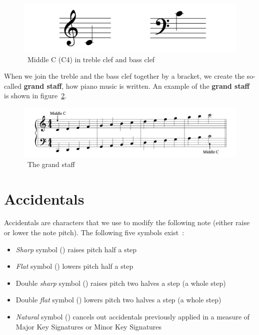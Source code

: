 \begin{figure}
    \centering
    \includegraphics[width=\textwidth]{assets/middle-c}
    \caption{~Middle C (C4) in treble clef and bass clef~\cite{music-theory}}\label{fig:middle-c}
\end{figure}

When we join the treble and the bass clef together by a bracket, we create the so-called \textbf{grand staff}, how piano music is written.
An example of the \textbf{grand staff} is shown in figure~\ref{fig:grand-staff}.~\cite{music-theory}


\begin{figure}
    \centering
    \includegraphics[width=\textwidth]{assets/grand-staff}
    \caption{~The grand staff~\cite{music-theory}}\label{fig:grand-staff}
\end{figure}


\section{Accidentals}\label{sec:accidentals}

Accidentals are characters that we use to modify the following note (either raise or lower the note pitch).
The following five symbols exist~\cite{music-theory}:

\begin{itemize}
    \item \textit{Sharp} symbol (\sh) raises pitch half a step
    \item \textit{Flat} symbol (\fl) lowers pitch half a step
    \item Double \textit{sharp} symbol (\musDoubleSharp) raises pitch two halves a step (a whole step)
    \item Double \textit{flat} symbol (\musDoubleFlat) lowers pitch two halves a step (a whole step)
    \item \textit{Natural} symbol (\na) cancels out accidentals previously applied in a measure of Major Key Signatures or Minor Key Signatures
\end{itemize}


